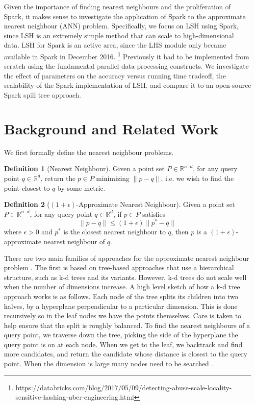 \documentclass[letterpaper,twocolumn,10pt]{article}
\theoremstyle{definition}
\newtheorem{definition}{Definition}[section]
\begin{document}
Given the importance of finding nearest neighbours and the proliferation of Spark, 
it makes sense to investigate the application of Spark to the approximate nearest 
neighbour (ANN) problem. Specifically, we focus on LSH using Spark, since LSH is an 
extremely simple method that can scale to high-dimensional data. LSH for Spark is 
an active area, since the LHS module only became available in Spark in December 
2016. 
\footnote{https://databricks.com/blog/2017/05/09/detecting-abuse-scale-locality-sensitive-hashing-uber-engineering.html}
  Previously it had to be implemented from scratch using the fundamental parallel 
  data processing constructs. We investigate the effect of parameters on the 
  accuracy versus running time tradeoff, the scalability of the Spark 
  implementation of LSH, and compare it to an open-source Spark spill tree 
  approach. \\


\section{Background and Related Work}

We first formally define the nearest neighbour problems.

\begin{definition}[Nearest Neighbour]
	
	Given a  point set $P \in \mathbb{R}^{n \cdot d}$, for any query point $q \in 
	\mathbb{R}^d$, return the $p \in P$ minimizing $\| p-q \|$, i.e. we wish to 
	find the point closest to $q$ by some metric.
	
\end{definition}

\begin{definition}[$(1 + \epsilon)$-Approximate Nearest Neighbour]
	Given a  point set $P \in \mathbb{R}^{n \cdot d}$, for any query point $q \in 
	\mathbb{R}^d$, if $p \in P$ satisfies
	\[ \| p-q \| \leq (1+\epsilon)\| p^*-q \|  \]
	where $\epsilon > 0$ and $p^*$ is the closest nearest neighbour to $q$, then 
	$p$ is a $(1 + \epsilon)$-approximate nearest neighbour of $q$. 
	\cite{arya1994optimal}
\end{definition}

There are two main families of approaches for the approximate nearest neighbour 
problem \cite{fu2016efanna}. The first is based on tree-based approaches that use a 
hierarchical 
structure, such as k-d trees and its variants. However, k-d trees do not scale well 
when the number of dimensions increase. A high level sketch of how a k-d tree 
approach works is as follows. Each node of the tree splits its children into two 
halves, by a hyperplane perpendicular to a particular dimension. This is done 
recursively so in the leaf nodes we have the points themselves. Care is taken to 
help ensure that the split is roughly balanced. To find the nearest neighbours of a 
query point, we traverse down the tree, picking the side of the hyperplane the 
query point is on at each node. When we get to the leaf, we backtrack and find more 
candidates, and return the candidate whose distance is closest to the query point. 
When the dimension is large many nodes need to be searched 
\cite{silpa2008optimised}. \\
\end{document}
